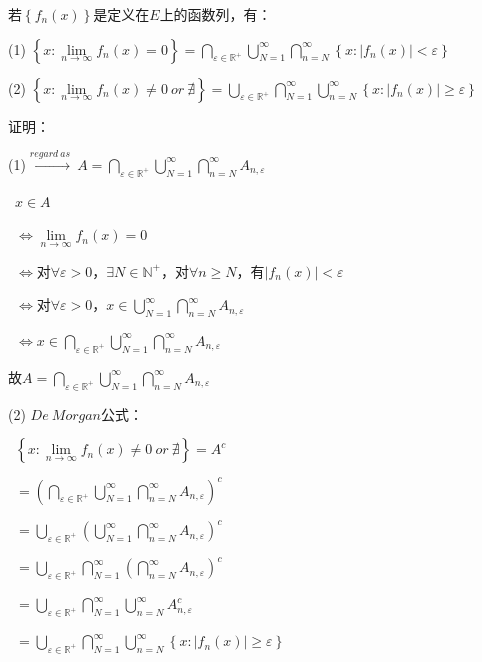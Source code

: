 \begin{eg}
若$\left\{f_{n}(x)\right\}$是定义在$E$上的函数列，有：
\par (1) $\left\{x : \lim \limits_{n \to \infty} f_{n}(x) = 0 \right\} = \bigcap \limits_{\varepsilon \in \mathbb{R}^{+}}\bigcup \limits_{N = 1}^{\infty}\bigcap \limits_{n=N}^{\infty}\left\{x : \left\lvert f_{n}(x)\right\rvert < \varepsilon \right\} $
\par (2) $\left\{x : \lim \limits_{n \to \infty} f_{n}(x) \neq  0 \ or \ \nexists \right\} = \bigcup \limits_{\varepsilon \in \mathbb{R}^{+}}\bigcap \limits_{N = 1}^{\infty}\bigcup \limits_{n=N}^{\infty}\left\{x : \left\lvert f_{n}(x)\right\rvert \geqslant \varepsilon \right\} $
\end{eg}
\noindent 证明：
\par (1)$\xrightarrow{regard \ as} \ A = \bigcap \limits_{\varepsilon \in \mathbb{R}^{+}}\bigcup \limits_{N = 1}^{\infty}\bigcap \limits_{n=N}^{\infty}A_{n,\varepsilon }$
\par \quad \ $x \in A$
\par \quad \ $\Leftrightarrow \lim \limits_{n \to \infty} f_{n}(x) = 0$
\par \quad \ $\Leftrightarrow$对$\forall \varepsilon > 0$，$\exists N \in \mathbb{N}^{+}$，对$\forall n\geqslant N$，有$\left\lvert f_{n}(x)\right\rvert < \varepsilon$
\par \quad \ $\Leftrightarrow$对$\forall \varepsilon > 0$，$x \in \bigcup \limits_{N = 1}^{\infty}\bigcap \limits_{n=N}^{\infty}A_{n,\varepsilon }$
\par \quad \ $\Leftrightarrow x \in  \bigcap \limits_{\varepsilon \in \mathbb{R}^{+}}\bigcup \limits_{N = 1}^{\infty}\bigcap \limits_{n=N}^{\infty}A_{n,\varepsilon }$
\par \quad 故$A = \bigcap \limits_{\varepsilon \in \mathbb{R}^{+}}\bigcup \limits_{N = 1}^{\infty}\bigcap \limits_{n=N}^{\infty}A_{n,\varepsilon }$
\par (2) $De \ Morgan$公式：
\par \quad \ $\left\{x : \lim \limits_{n \to \infty} f_{n}(x) \neq  0 \ or \ \nexists \right\} = A^{c}$
\par \quad \ $= \left(\bigcap \limits_{\varepsilon \in \mathbb{R}^{+}}\bigcup \limits_{N = 1}^{\infty}\bigcap \limits_{n=N}^{\infty}A_{n,\varepsilon}\right)^{c} $
\par \quad \ $= \bigcup \limits_{\varepsilon \in \mathbb{R}^{+}}\left(\bigcup \limits_{N = 1}^{\infty}\bigcap \limits_{n=N}^{\infty}A_{n,\varepsilon}\right)^{c} $
\par \quad \ $= \bigcup \limits_{\varepsilon \in \mathbb{R}^{+}}\bigcap \limits_{N = 1}^{\infty}\left(\bigcap \limits_{n=N}^{\infty}A_{n,\varepsilon}\right)^{c} $
\par \quad \ $= \bigcup \limits_{\varepsilon \in \mathbb{R}^{+}}\bigcap \limits_{N = 1}^{\infty}\bigcup \limits_{n=N}^{\infty}A_{n,\varepsilon}^{c} $
\par \quad \ $= \bigcup \limits_{\varepsilon \in \mathbb{R}^{+}}\bigcap \limits_{N = 1}^{\infty}\bigcup \limits_{n=N}^{\infty}\left\{x : \left\lvert f_{n}(x)\right\rvert \geqslant \varepsilon \right\}$

